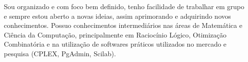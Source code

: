 

\begin{cvparagraph}
	{Sou organizado e com foco bem definido, tenho facilidade de trabalhar em grupo e sempre estou aberto a novas ideias, assim aprimorando e adquirindo novos conhecimentos. Possuo conhecimentos intermediários nas áreas de Matemática e Ciência da Computação, principalmente em Raciocínio Lógico, Otimização Combinatória e na utilização de softwares práticos utilizados no mercado e pesquisa (CPLEX, PgAdmin, Scilab).}
\end{cvparagraph}

